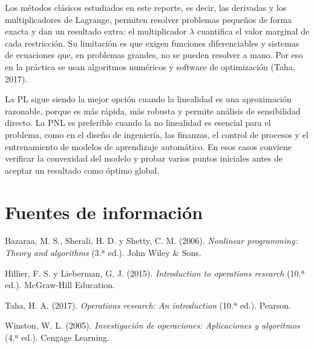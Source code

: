 \documentclass[12pt,letterpaper]{article}
\begin{document}
Los métodos clásicos estudiados en este reporte, es decir, las derivadas y los multiplicadores de Lagrange, permiten resolver problemas pequeños de forma exacta y dan un resultado extra: el multiplicador $\lambda$ cuantifica el valor marginal de cada restricción. Su limitación es que exigen funciones diferenciables y sistemas de ecuaciones que, en problemas grandes, no se pueden resolver a mano. Por eso en la práctica se usan algoritmos numéricos y software de optimización (Taha, 2017).

La PL sigue siendo la mejor opción cuando la linealidad es una aproximación razonable, porque es más rápida, más robusta y permite análisis de sensibilidad directo. La PNL es preferible cuando la no linealidad es esencial para el problema, como en el diseño de ingeniería, las finanzas, el control de procesos y el entrenamiento de modelos de aprendizaje automático. En esos casos conviene verificar la convexidad del modelo y probar varios puntos iniciales antes de aceptar un resultado como óptimo global.

\newpage
\section*{Fuentes de información}
\begingroup\setlength{\parindent}{-0.5in}\setlength{\leftskip}{0.5in}
Bazaraa, M. S., Sherali, H. D. y Shetty, C. M. (2006). \emph{Nonlinear programming: Theory and algorithms} (3.ª ed.). John Wiley \& Sons.

Hillier, F. S. y Lieberman, G. J. (2015). \emph{Introduction to operations research} (10.ª ed.). McGraw-Hill Education.

Taha, H. A. (2017). \emph{Operations research: An introduction} (10.ª ed.). Pearson.

Winston, W. L. (2005). \emph{Investigación de operaciones: Aplicaciones y algoritmos} (4.ª ed.). Cengage Learning.
\endgroup
\end{document}
